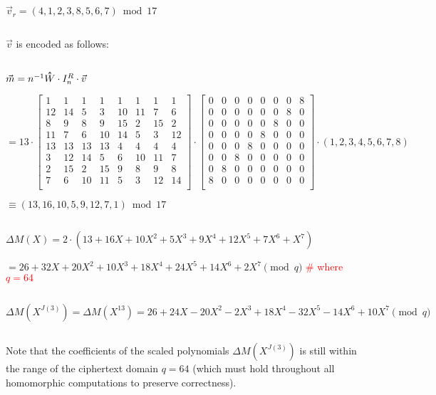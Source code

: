 $\vec{v}_r = (4, 1, 2, 3, 8, 5, 6, 7) \bmod 17$

$ $

$\vec{v}$ is encoded as follows:

$ $

$\vec{m} = n^{-1} \hathat{W} \cdot I_n^R \cdot \vec{v} $

$= 13 \cdot  \begin{bmatrix}
1 & 1 & 1 & 1 & 1 & 1 & 1 & 1\\
12&14&5&3&10&11&7&6\\
8&9&8&9&15&2&15&2\\
11&7&6&10&14&5&3&12\\
13&13&13&13&4&4&4&4\\
3&12&14&5&6&10&11&7\\
2&15&2&15&9&8&9&8\\
7&6&10&11&5&3&12&14\\
\end{bmatrix} \cdot \begin{bmatrix}
0 & 0 & 0 & 0 & 0 & 0 & 0 & 8\\
0 & 0 & 0 & 0 & 0 & 0 & 8 & 0\\
0 & 0 & 0 & 0 & 0 & 8 & 0 & 0\\
0 & 0 & 0 & 0 & 8 & 0 & 0 & 0\\
0 & 0 & 0 & 8 & 0 & 0 & 0 & 0\\
0 & 0 & 8 & 0 & 0 & 0 & 0 & 0\\
0 & 8 & 0 & 0 & 0 & 0 & 0 & 0\\
8 & 0 & 0 & 0 & 0 & 0 & 0 & 0\\
\end{bmatrix} \cdot (1,2,3,4,5,6,7,8) $

$ \equiv (13, 16, 10, 5, 9, 12, 7, 1)  \bmod 17$


$ $

$\Delta M(X) = 2\cdot(13 + 16X + 10X^2 + 5X^3 + 9X^4 + 12X^5 + 7X^6 + X^7)$

$ = 26 + 32X + 20X^2 + 10X^3 + 18X^4 + 24X^5 + 14X^6 + 2X^7 \pmod{q}$ \textcolor{red}{\text{ } \# where $q = 64$}

$ $


$\Delta M(X^{J(3)}) = \Delta M(X^{13}) = 26 + 24X - 20X^2 - 2X^3 + 18X^4 - 32X^5 - 14X^6 + 10X^7 \pmod{q}$

$ $

Note that the coefficients of the scaled polynomials $\Delta M(X^{J(3)})$ is still within the range of the ciphertext domain $q=64$ (which must hold throughout all homomorphic computations to preserve correctness). 

